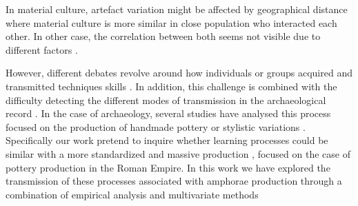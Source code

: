 \documentclass[review]{elsarticle}
\begin{document}

 In material culture, artefact variation might be affected by geographical distance \citep{bjorklund_effect_2010,shennan_isolation-by-distance_2015, van_strien_isolation-by-distance_2015} where material culture is more similar in close population who interacted each other. In other case, the correlation between both seems not visible due to different factors \citep{hart_effects_2012}. 





However, different debates revolve around how individuals or groups acquired and transmitted techniques skills  \citep{bowser_learning_2008, mesoudi_cultural_2008}. In addition, this challenge is combined with the difficulty detecting the different modes of transmission in the archaeological record \citep{roux_standardization_2015}. In the case of archaeology, several studies have analysed this process focused on the production of handmade pottery \citep{steele_james_ceramic_2010} or stylistic variations \citep{neiman_stylistic_1995, shennan_ceramic_2001}. Specifically our work pretend to inquire whether learning processes could be similar with a more standardized and massive production \citep{gandon_copying_2014}, focused on the case of pottery production in the Roman Empire. In this work we have explored the transmission of these processes associated with amphorae production through a combination of empirical analysis and multivariate methods
                     
\end{document}
